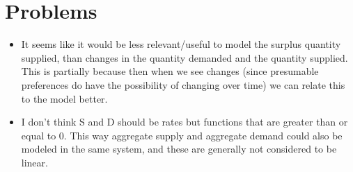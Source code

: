 \documentclass{article}
\begin{document}
\section{Problems}
\begin{itemize}
	\item It seems like it would be less relevant/useful to model the surplus quantity supplied, than changes in the quantity demanded and the quantity supplied. This is partially because then when we see changes (since presumable preferences do have the possibility of changing over time) we can relate this to the model better.
	\item I don't think S and D should be rates but functions that are greater than or equal to 0. This way aggregate supply and aggregate demand could also be modeled in the same system, and these are generally not considered to be linear.
\end{itemize}
\end{document}
